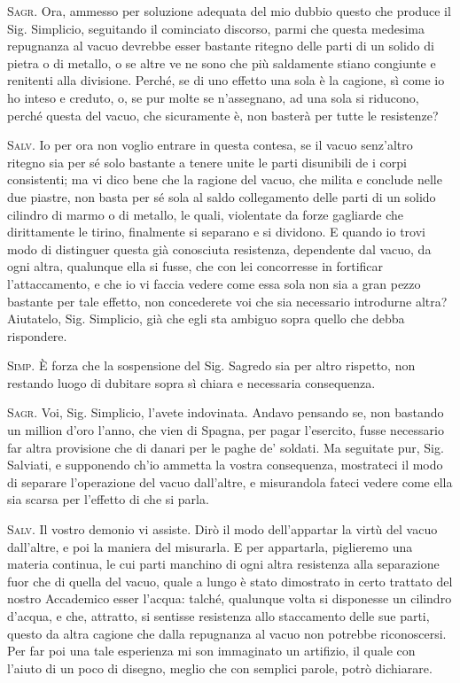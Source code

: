\documentclass[11pt,twoside,openany]{book}
\newcommand{\speaker}[1]{\textcolor{rubric}{\textsc{#1}}\space}
\begin{document}
\speaker{Sagr.} Ora, ammesso per soluzione adequata del mio dubbio questo che produce il Sig. Simplicio, seguitando il cominciato discorso, parmi che questa medesima repugnanza al vacuo devrebbe esser bastante ritegno delle parti di un solido di pietra o di metallo, o se altre ve ne sono che più saldamente stiano congiunte e renitenti alla divisione. Perché, se di uno effetto una sola è la cagione, sì come io ho inteso e creduto, o, se pur molte se n'assegnano, ad una sola si riducono, perché questa del vacuo, che sicuramente è, non basterà per tutte le resistenze?

\speaker{Salv.} Io per ora non voglio entrare in questa contesa, se il vacuo senz'altro ritegno sia per sé solo bastante a tenere unite le parti disunibili de i corpi consistenti; ma vi dico bene che la ragione del vacuo, che milita e conclude nelle due piastre, non basta per sé sola al saldo collegamento delle parti di un solido cilindro di marmo o di metallo, le quali, violentate da forze gagliarde che dirittamente le tirino, finalmente si separano e si dividono. E quando io trovi modo di distinguer questa già conosciuta resistenza, dependente dal vacuo, da ogni altra, qualunque ella si fusse, che con lei concorresse in fortificar l'attaccamento, e che io vi faccia vedere come essa sola non sia a gran pezzo bastante per tale effetto, non concederete voi che sia necessario introdurne altra? Aiutatelo, Sig. Simplicio, già che egli sta ambiguo sopra quello che debba rispondere.

\speaker{Simp.} È forza che la sospensione del Sig. Sagredo sia per altro rispetto, non restando luogo di dubitare sopra sì chiara e necessaria consequenza.

\speaker{Sagr.} Voi, Sig. Simplicio, l'avete indovinata. Andavo pensando se, non bastando un million d'oro l'anno, che vien di Spagna, per pagar l'esercito, fusse necessario far altra provisione che di danari per le paghe de' soldati. Ma seguitate pur, Sig. Salviati, e supponendo ch'io ammetta la vostra consequenza, mostrateci il modo di separare l'operazione del vacuo dall'altre, e misurandola fateci vedere come ella sia scarsa per l'effetto di che si parla.

\speaker{Salv.} Il vostro demonio vi assiste. Dirò il modo dell'appartar la virtù del vacuo dall'altre, e poi la maniera del misurarla. E per appartarla, piglieremo una materia continua, le cui parti manchino di ogni altra resistenza alla separazione fuor che di quella del vacuo, quale a lungo è stato dimostrato in certo trattato del nostro Accademico esser l'acqua: talché, qualunque volta si disponesse un cilindro d'acqua, e che, attratto, si sentisse resistenza allo staccamento delle sue parti, questo da altra cagione che dalla repugnanza al vacuo non potrebbe riconoscersi. Per far poi una tale esperienza mi son immaginato un artifizio, il quale con l'aiuto di un poco di disegno, meglio che con semplici parole, potrò dichiarare.
\end{document}
